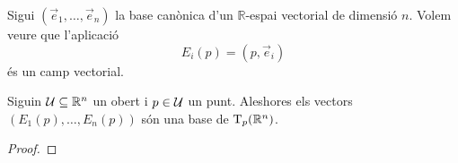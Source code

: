 \documentclass[../Apunts.tex]{subfiles}
\begin{document}
	\begin{example}%
		\label{ex:camp vectorial canònic}
		Sigui \((\vec{e}_{1},\dots,\vec{e}_{n})\) la base canònica d'un \(\mathbb{R}\)-espai vectorial de dimensió \(n\). Volem veure que l'aplicació
		\[E_{i}(p)=(p,\vec{e}_{i})\]
		és un camp vectorial.
	\end{example}
	\begin{solution}
	\end{solution}
	\begin{proposition}
		\label{prop:els camps vectorials canònics són una base de l'espai tangent}
		Siguin \(\mathcal{U}\subseteq\mathbb{R}^{n}\) un obert i \(p\in\mathcal{U}\) un punt. Aleshores els vectors \((E_{1}(p),\dots,E_{n}(p))\) són una base de \(\operatorname{T}_{p}(\mathbb{R}^{n})\).
	\end{proposition}
	\begin{proof}
	\end{proof}
\end{document}
